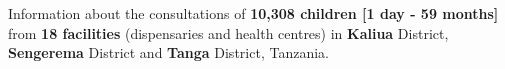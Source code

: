 \documentclass[
  letterpaper,
  DIV=11,
  numbers=noendperiod,
  oneside]{scrreprt}
\begin{document}
Information about the consultations of \textbf{10,308 children {[}1 day
- 59 months{]}} from \textbf{18 facilities} (dispensaries and health
centres) in \textbf{Kaliua} District, \textbf{Sengerema} District and
\textbf{Tanga} District, Tanzania.

\begin{figure}

\begin{minipage}[t]{0.50\linewidth}

{\centering 


}

\subcaption{\label{fig-tanzania-study-regions}}
\end{minipage}%
%
\begin{minipage}[t]{0.50\linewidth}

{\centering 

}
\end{minipage}
\end{figure}
\end{document}
